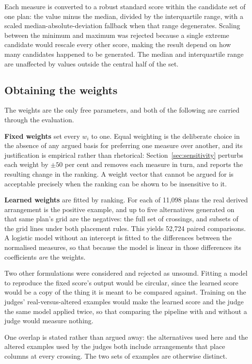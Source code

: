 Each measure is converted to a robust standard score within the candidate
set of one plan: the value minus the median, divided by the interquartile
range, with a scaled median-absolute-deviation fallback when that range
degenerates. Scaling between the minimum and maximum was rejected because
a single extreme candidate would rescale every other score, making the
result depend on how many candidates happened to be generated. The median
and interquartile range are unaffected by values outside the central half
of the set.

\subsection{Obtaining the weights}
\label{sec:weights}

The weights are the only free parameters, and both of the following are
carried through the evaluation.

\textbf{Fixed weights} set every $w_i$ to one. Equal weighting is the
deliberate choice in the absence of any argued basis for preferring one
measure over another, and its justification is empirical rather than
rhetorical: Section~\ref{sec:sensitivity} perturbs each weight by
$\pm 50$ per cent and removes each measure in turn, and reports the
resulting change in the ranking. A weight vector that cannot be argued for
is acceptable precisely when the ranking can be shown to be insensitive to
it.

\textbf{Learned weights} are fitted by ranking. For each of 11,098 plans
the real derived arrangement is the positive example, and up to five
alternatives generated on that same plan's grid are the negatives: the
full set of crossings, and subsets of the grid lines under both placement
rules. This yields 52,724 paired comparisons. A logistic model without an
intercept is fitted to the differences between the normalised measures, so
that because the model is linear in those differences its coefficients
\emph{are} the weights.

Two other formulations were considered and rejected as unsound. Fitting a
model to reproduce the fixed score's output would be circular, since the
learned score would be a copy of the thing it is meant to be compared
against. Training on the judges' real-versus-altered examples would make
the learned score and the judge the same model applied twice, so that
comparing the pipeline with and without a judge would measure nothing.

One overlap is stated rather than argued away: the alternatives used here
and the altered examples used by the judges both include arrangements that
place columns at every crossing. The two sets of examples are otherwise
distinct.
